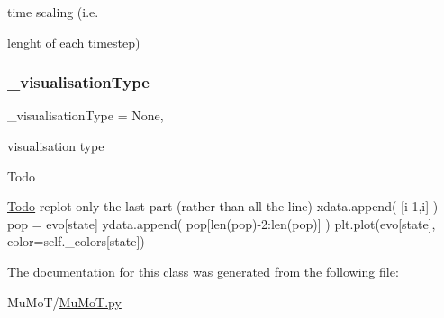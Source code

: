 time scaling (i.\+e. 

lenght of each timestep) \mbox{\label{class_mu_mo_t_1_1_mu_mo_t_1_1_mu_mo_tmultiagent_view_ae8c8d7969b8ab8f31df9d1d1d10eabb9}} 
\subsubsection{\texorpdfstring{\+\_\+visualisation\+Type}{\_visualisationType}}
{\footnotesize\ttfamily \+\_\+visualisation\+Type = None\hspace{0.3cm}{\ttfamily [static]}, {\ttfamily [private]}}



visualisation type 

\begin{DoxyRefDesc}{Todo}
\item[\hyperlink{todo__todo000062}{Todo}]replot only the last part (rather than all the line) xdata.\+append( \mbox{[}i-\/1,i\mbox{]} ) pop = evo\mbox{[}state\mbox{]} ydata.\+append( pop\mbox{[}len(pop)-\/2\+:len(pop)\mbox{]} ) plt.\+plot(evo\mbox{[}state\mbox{]}, color=self.\+\_\+colors\mbox{[}state\mbox{]}) \end{DoxyRefDesc}


The documentation for this class was generated from the following file\+:\begin{DoxyCompactItemize}
\item 
Mu\+Mo\+T/\hyperlink{_mu_mo_t_8py}{Mu\+Mo\+T.\+py}\end{DoxyCompactItemize}
